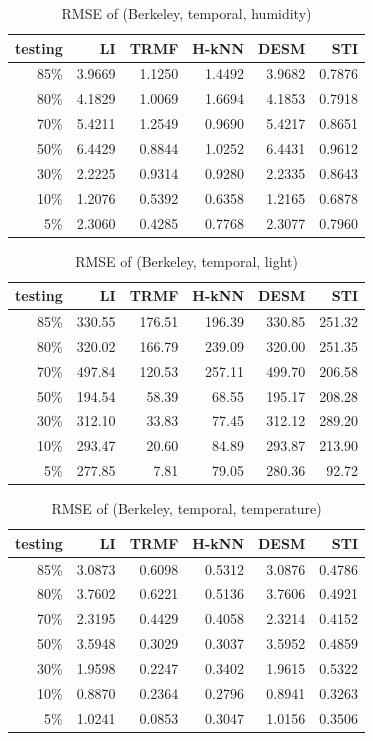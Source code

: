 \begin{table}[htbp]
\centering
\caption{RMSE of (Berkeley, temporal, humidity)}
\label{table:berkeley_temporal_hum}
\begin{tabular}{ r | r r r r r}
	testing	&LI	&TRMF	&H-kNN	&DESM	&STI\\ \hline
	85\%	&3.9669	&1.1250	&1.4492	&3.9682	&0.7876\\ 
	80\%	&4.1829	&1.0069	&1.6694	&4.1853	&0.7918\\
	70\%	&5.4211	&1.2549	&0.9690	&5.4217	&0.8651\\
	50\%	&6.4429	&0.8844	&1.0252	&6.4431	&0.9612\\
	30\%	&2.2225	&0.9314	&0.9280	&2.2335	&0.8643\\
	10\%	&1.2076	&0.5392	&0.6358	&1.2165	&0.6878\\
	 5\%	&2.3060	&0.4285	&0.7768	&2.3077	&0.7960\\
\end{tabular}
\end{table}

\begin{table}[htbp]
\centering
\caption{RMSE of (Berkeley, temporal, light)}
\label{table:berkeley_temporal_light}
\begin{tabular}{ r | r r r r r}
	testing	&LI	&TRMF	&H-kNN	&DESM	&STI\\ \hline
	85\%	&330.55	&176.51	&196.39	&330.85	&251.32\\ 
	80\%	&320.02	&166.79	&239.09	&320.00	&251.35\\
	70\%	&497.84	&120.53	&257.11	&499.70	&206.58\\
	50\%	&194.54	&58.39	&68.55	&195.17	&208.28\\
	30\%	&312.10	&33.83	&77.45	&312.12	&289.20\\
	10\%	&293.47	&20.60	&84.89	&293.87	&213.90\\
	 5\%	&277.85	&7.81	&79.05	&280.36	& 92.72\\
\end{tabular}
\end{table}


\begin{table}[htbp]
\centering
\caption{RMSE of (Berkeley, temporal, temperature)}
\label{table:berkeley_temporal_tem}
\begin{tabular}{ r | r r r r r}
	testing	&LI	&TRMF	&H-kNN	&DESM	&STI\\ \hline
	85\%	&3.0873	&0.6098	&0.5312	&3.0876	&0.4786\\ 
	80\%	&3.7602	&0.6221	&0.5136	&3.7606	&0.4921\\
	70\%	&2.3195	&0.4429	&0.4058	&2.3214	&0.4152\\
	50\%	&3.5948	&0.3029	&0.3037	&3.5952	&0.4859\\
	30\%	&1.9598	&0.2247	&0.3402	&1.9615	&0.5322\\
	10\%	&0.8870	&0.2364	&0.2796	&0.8941	&0.3263\\
	 5\%	&1.0241	&0.0853	&0.3047	&1.0156	&0.3506\\
\end{tabular}
\end{table}

